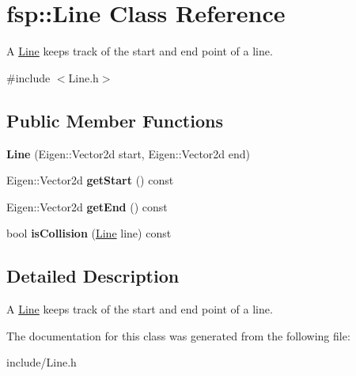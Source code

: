 \hypertarget{classfsp_1_1_line}{\section{fsp\-:\-:Line Class Reference}
\label{classfsp_1_1_line}
}


A \hyperlink{classfsp_1_1_line}{Line} keeps track of the start and end point of a line.  




{\ttfamily \#include $<$Line.\-h$>$}

\subsection*{Public Member Functions}
\begin{DoxyCompactItemize}
\item 
\hypertarget{classfsp_1_1_line_ab9d68085fe67d743a71f847a9b7ebadd}{{\bfseries Line} (Eigen\-::\-Vector2d start, Eigen\-::\-Vector2d end)}\label{classfsp_1_1_line_ab9d68085fe67d743a71f847a9b7ebadd}

\item 
\hypertarget{classfsp_1_1_line_ad68b530632362441b0e91c842cbec9c0}{Eigen\-::\-Vector2d {\bfseries get\-Start} () const }\label{classfsp_1_1_line_ad68b530632362441b0e91c842cbec9c0}

\item 
\hypertarget{classfsp_1_1_line_af6511047a5a7ba4ae878bb4c29a0e21e}{Eigen\-::\-Vector2d {\bfseries get\-End} () const }\label{classfsp_1_1_line_af6511047a5a7ba4ae878bb4c29a0e21e}

\item 
\hypertarget{classfsp_1_1_line_afeadd2599048bc272d9c699742141fe1}{bool {\bfseries is\-Collision} (\hyperlink{classfsp_1_1_line}{Line} line) const }\label{classfsp_1_1_line_afeadd2599048bc272d9c699742141fe1}

\end{DoxyCompactItemize}


\subsection{Detailed Description}
A \hyperlink{classfsp_1_1_line}{Line} keeps track of the start and end point of a line. 

The documentation for this class was generated from the following file\-:\begin{DoxyCompactItemize}
\item 
include/Line.\-h\end{DoxyCompactItemize}
